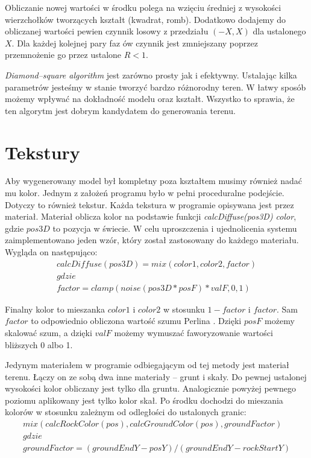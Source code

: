 \documentclass[inz,longabstract]{iithesis}
\begin{document}
        Obliczanie nowej wartości w środku polega na wzięciu średniej z wysokości wierzchołków tworzących kształt (kwadrat, romb). Dodatkowo dodajemy do obliczanej wartości pewien czynnik losowy z przedziału $(-X, X)$ dla ustalonego $X$. Dla każdej kolejnej pary faz ów czynnik jest zmniejszany poprzez przemnożenie go przez ustalone $R < 1$.
        
        \textit{Diamond--square algorithm} jest zarówno prosty jak i efektywny. Ustalając kilka parametrów jesteśmy w stanie tworzyć bardzo różnorodny teren. W łatwy sposób możemy wpływać na dokładność modelu oraz kształt. Wszystko to sprawia, że ten algorytm jest dobrym kandydatem do generowania terenu.
        
    \section{Tekstury}
        Aby wygenerowany model był kompletny poza kształtem musimy również nadać mu kolor. Jednym z założeń programu było w pełni proceduralne podejście. Dotyczy to również tekstur. Każda tekstura w programie opisywana jest przez materiał. Materiał oblicza kolor na podstawie funkcji \textit{calcDiffuse(pos3D) \textrightarrow color}, gdzie $pos3D$ to pozycja w świecie. W celu uproszczenia i ujednolicenia systemu zaimplementowano jeden wzór, który został zastosowany do każdego materiału. Wygląda on następująco:
        \begin{gather*} \label{eqn:material}
            calcDiffuse(pos3D) = mix(color1, color2, factor) \\
            gdzie \\
            factor = clamp(noise(pos3D * posF) * valF, 0, 1)
        \end{gather*}
        

        Finalny kolor to mieszanka $color1$ i $color2$ w stosunku $1 - factor$ i $factor$. Sam $factor$ to odpowiednio obliczona wartość szumu Perlina \cite{perlinNoise}. Dzięki $posF$ możemy skalować szum, a dzięki $valF$ możemy wymuszać faworyzowanie wartości bliższych 0 albo 1.
        
        Jedynym materiałem w programie odbiegającym od tej metody jest materiał terenu. Łączy on ze sobą dwa inne materiały -- grunt i skały. Do pewnej ustalonej wysokości kolor obliczany jest tylko dla gruntu. Analogicznie powyżej pewnego poziomu aplikowany jest tylko kolor skał. Po środku dochodzi do mieszania kolorów w stosunku zależnym od odległości do ustalonych granic:
        \begin{gather*}
        mix(calcRockColor(pos), calcGroundColor(pos), groundFactor) \\
        gdzie \\
        groundFactor = (groundEndY - posY) / (groundEndY - rockStartY) \\
        \end{gather*}
        
\end{document}
